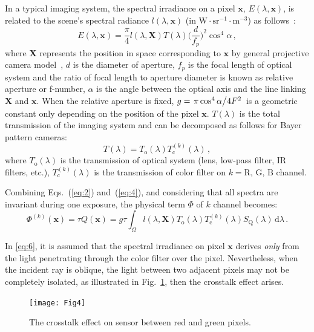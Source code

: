 \documentclass[9pt,twocolumn,twoside]{osajnl}
\newcommand{\D}{\mathrm{d}}
\begin{document}
In a typical imaging system, the spectral irradiance on a pixel $\mathbf{x}$, $E(\lambda,\mathbf{x})$, is related to the scene’s spectral radiance $l(\lambda,\mathbf{x})$ (in $\text{W}\cdot\text{sr}^{-1}\cdot\text{m}^{-3}$) as follows~\cite{Horn:79}: 
\begin{equation}
E(\lambda,\mathbf{x}) = \frac{\pi}{4}l(\lambda,\mathbf{X})T(\lambda)\Big(\frac{d}{f_p}\Big)^2\cos^4\alpha\,,
\label{eq:4}
\end{equation}
where $\mathbf{X}$ represents the position in space corresponding to $\mathbf{x}$ by general projective camera model~\cite{Hartley:04}, $d$ is the diameter of aperture, $f_p$ is the focal length of optical system and the ratio of focal length to aperture diameter is known as relative aperture or f-number, $\alpha$ is the angle between the optical axis and the line linking $\mathbf{X}$ and $\mathbf{x}$. When the relative aperture is fixed, $g = \left.\pi\cos^4\alpha\middle/4F^2\right.$ is a geometric constant only depending on the position of the pixel $\mathbf{x}$. $T(\lambda)$ is the total transmission of the imaging system and can be decomposed as follows for Bayer pattern cameras:
\begin{equation}
T(\lambda) = T_\text{o}(\lambda)T_\text{c}^{(k)}(\lambda)\,,
\label{eq:5}
\end{equation}
where $T_\text{o}(\lambda)$ is the transmission of optical system (lens, low-pass filter, IR filters, etc.), $T_\text{c}^{(k)}(\lambda)$ is the transmission of color filter on $k=\text{R, G, B}$ channel.

Combining Eqs.~(\ref{eq:2}) and~(\ref{eq:4}), and considering that all spectra are invariant during one exposure, the physical term $\Phi$ of $k$ channel becomes:
\begin{equation}
\Phi^{(k)}(\mathbf{x}) = \tau Q(\mathbf{x}) = g\tau\int_\Omega{}l(\lambda,\mathbf{X})T_\text{o}(\lambda )T_\text{c}^{(k)}(\lambda)S_\text{Q}(\lambda)\,\D{\lambda}\,.
\label{eq:6}
\end{equation}

In \eqref{eq:6}, it is assumed that the spectral irradiance on pixel $\mathbf{x}$ derives \textit{only} from the light penetrating through the color filter over the pixel. Nevertheless, when the incident ray is oblique, the light between two adjacent pixels may not be completely isolated, as illustrated in Fig.~\ref{fig:4}, then the crosstalk effect arises.

\begin{figure}[tbp]
	\centering
	\texttt{[image: Fig4]}
	\caption{The crosstalk effect on sensor between red and green pixels.}
	\label{fig:4}
\end{figure}
\end{document}
